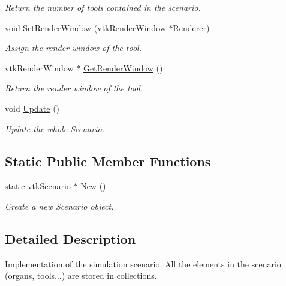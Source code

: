 \begin{DoxyCompactItemize}
\begin{DoxyCompactList}\small\item\em Return the number of tools contained in the scenario. \item\end{DoxyCompactList}\item 
void \hyperlink{classvtkScenario_a65e86f64884268d0e100345d472a35c8}{SetRenderWindow} (vtkRenderWindow $\ast$Renderer)
\begin{DoxyCompactList}\small\item\em Assign the render window of the tool. \item\end{DoxyCompactList}\item 
vtkRenderWindow $\ast$ \hyperlink{classvtkScenario_a4a3cb31864be1da763b5acb3377a32db}{GetRenderWindow} ()
\begin{DoxyCompactList}\small\item\em Return the render window of the tool. \item\end{DoxyCompactList}\item 
void \hyperlink{classvtkScenario_aac52c3827cbdc1d3db03fb313f664cc0}{Update} ()
\begin{DoxyCompactList}\small\item\em Update the whole Scenario. \item\end{DoxyCompactList}\end{DoxyCompactItemize}
\subsection*{Static Public Member Functions}
\begin{DoxyCompactItemize}
\item 
\hypertarget{classvtkScenario_a5116235ae7bcaf31bc483d4f33539337}{
static \hyperlink{classvtkScenario}{vtkScenario} $\ast$ \hyperlink{classvtkScenario_a5116235ae7bcaf31bc483d4f33539337}{New} ()}
\label{classvtkScenario_a5116235ae7bcaf31bc483d4f33539337}

\begin{DoxyCompactList}\small\item\em Create a new Scenario object. \item\end{DoxyCompactList}\end{DoxyCompactItemize}


\subsection{Detailed Description}
Implementation of the simulation scenario. All the elements in the scenario (organs, tools...) are stored in collections. 


